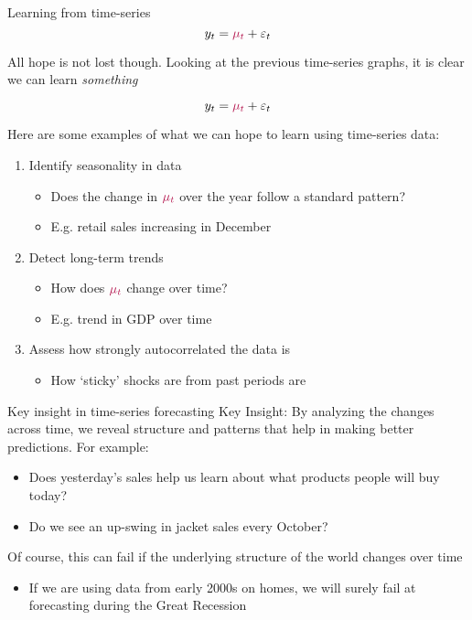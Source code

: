 \documentclass[aspectratio=169,t,11pt,table]{beamer}
\begin{document}
\begin{frame}{Learning from time-series}
  \vspace*{-\bigskipamount}
  $$
    y_t = {\color[HTML]{B3114B} \mu_t} + \varepsilon_t
  $$

  \bigskip
  All hope is not lost though. Looking at the previous time-series graphs, it is clear we can learn \emph{something}
\end{frame}

\begin{frame}{}
  $$
    y_t = {\color[HTML]{B3114B} \mu_t} + \varepsilon_t
  $$
  
  Here are some examples of what we can hope to learn using time-series data:
  \begin{enumerate}
    \item Identify \alert{seasonality} in data 
    \begin{itemize}
      \item Does the change in ${\color[HTML]{B3114B} \mu_t}$ over the year follow a standard pattern?
      \item E.g. retail sales increasing in December
    \end{itemize}
    
    \item Detect long-term \alert{trends} 
    \begin{itemize}
      \item How does ${\color[HTML]{B3114B} \mu_t}$ change over time? 
      \item E.g. trend in GDP over time
    \end{itemize}
    
    \item Assess how \alert{strongly autocorrelated} the data is 
    \begin{itemize}
      \item How `sticky' shocks are from past periods are
    \end{itemize}
  \end{enumerate}
\end{frame}


\begin{frame}{Key insight in time-series forecasting}
  \alert{Key Insight}: By analyzing the changes across time, we reveal structure and patterns that help in making better predictions. 
  For example:
  \begin{itemize}
    \item Does yesterday's sales help us learn about what products people will buy today?
    \item Do we see an up-swing in jacket sales every October?
  \end{itemize}
  
  \pause
  \bigskip
  Of course, this can fail if the underlying structure of the world changes over time
  \begin{itemize}
    \item If we are using data from early 2000s on homes, we will surely fail at forecasting during the Great Recession
  \end{itemize}  
\end{frame}
\end{document}
